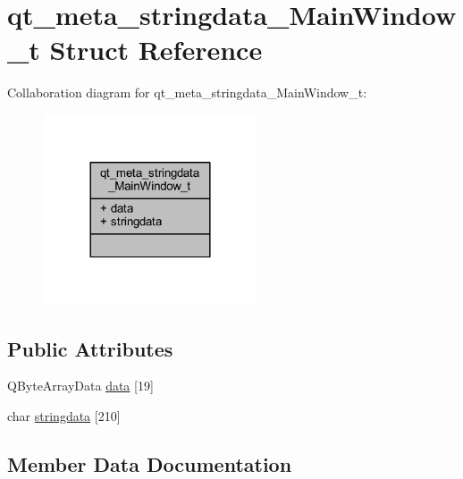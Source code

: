 \hypertarget{structqt__meta__stringdata___main_window__t}{}\section{qt\+\_\+meta\+\_\+stringdata\+\_\+\+Main\+Window\+\_\+t Struct Reference}
\label{structqt__meta__stringdata___main_window__t}


Collaboration diagram for qt\+\_\+meta\+\_\+stringdata\+\_\+\+Main\+Window\+\_\+t\+:
\nopagebreak
\begin{figure}[H]
\begin{center}
\leavevmode
\includegraphics[width=180pt]{da/d30/structqt__meta__stringdata___main_window__t__coll__graph}
\end{center}
\end{figure}
\subsection*{Public Attributes}
\begin{DoxyCompactItemize}
\item 
Q\+Byte\+Array\+Data \hyperlink{structqt__meta__stringdata___main_window__t_afd67093eee085680898ad79aa678a6fe}{data} \mbox{[}19\mbox{]}
\item 
char \hyperlink{structqt__meta__stringdata___main_window__t_a068b561b746276a78c37d2aad850d37b}{stringdata} \mbox{[}210\mbox{]}
\end{DoxyCompactItemize}


\subsection{Member Data Documentation}
\hypertarget{structqt__meta__stringdata___main_window__t_afd67093eee085680898ad79aa678a6fe}{}
